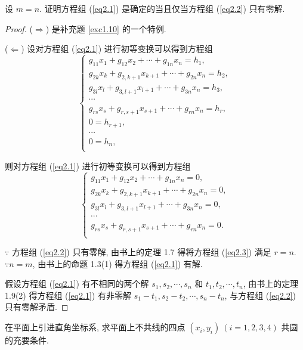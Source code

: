 \documentclass[color=black,device=normal,lang=cn,mode=geye]{elegantnote}
\begin{document}
\begin{exercisec}[1.11]
    设 $m=n$. 证明方程组 (\ref{eq2.1}) 是确定的当且仅当方程组 (\ref{eq2.2}) 只有零解.
\end{exercisec}
\begin{proof}
    ($\Rightarrow$) 是补充题 \ref{exc1.10} 的一个特例.

    ($\Leftarrow$) 设对方程组 (\ref{eq2.1}) 进行初等变换可以得到方程组
    \[\begin{cases}
        g_{11}x_1+g_{12}x_2+\cdots+g_{1n}x_n=h_1, \\
        g_{2k}x_k+g_{2,k+1}x_{k+1}+\cdots+g_{2n}x_n=h_2, \\
        g_{3l}x_l+g_{3,l+1}x_{l+1}+\cdots+g_{3n}x_n=h_3, \\
        \cdots \\
        g_{rs}x_s+g_{r,s+1}x_{s+1}+\cdots+g_{rn}x_n=h_r, \\
        0=h_{r+1}, \\
        \cdots \\
        0=h_n, \\
    \end{cases}\]

    则对方程组 (\ref{eq2.1}) 进行初等变换可以得到方程组
    \begin{equation}\label{eq2.3}
        \begin{cases}
            g_{11}x_1+g_{12}x_2+\cdots+g_{1n}x_n=0, \\
            g_{2k}x_k+g_{2,k+1}x_{k+1}+\cdots+g_{2n}x_n=0, \\
            g_{3l}x_l+g_{3,l+1}x_{l+1}+\cdots+g_{3n}x_n=0, \\
            \cdots \\
            g_{rs}x_s+g_{r,s+1}x_{s+1}+\cdots+g_{rn}x_n=0. \\
        \end{cases}
    \end{equation}
    
    $\because$ 方程组 (\ref{eq2.2}) 只有零解, 由书上的定理 1.7 得将方程组 (\ref{eq2.3}) 满足 $r=n$. $\because n=m$, 由书上的命题 1.3(1) 得方程组 (\ref{eq2.1}) 有解.
    
    假设方程组 (\ref{eq2.1}) 有不相同的两个解 $s_1,s_2,\cdots,s_n$ 和 $t_1,t_2,\cdots,t_n$, 由书上的定理 1.9(2) 得方程组 (\ref{eq2.1}) 有非零解 $s_1-t_1,s_2-t_2,\cdots,s_n-t_n$, 与方程组 (\ref{eq2.2}) 只有零解矛盾.
\end{proof}
\begin{exercisec}[1.15(2)]
    在平面上引进直角坐标系, 求平面上不共线的四点 $(x_i,y_i)\ (i=1,2,3,4)$ 共圆的充要条件.
\end{exercisec}
\end{document}
